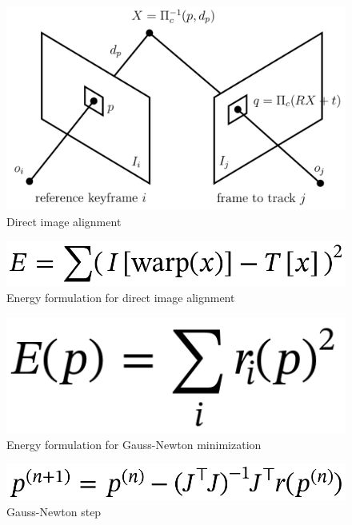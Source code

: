 \begin{figure}[ht]
	\centering
	\includegraphics[width=\linewidth]{assets/img/direct-image-alignment.png}
	\caption{Direct image alignment}%
	\label{fig:direct-image-alignment}
\end{figure}

\begin{figure}[ht]
	\centering
	\includegraphics[width=\linewidth]{assets/img/energy-warp.png}
	\caption{Energy formulation for direct image alignment}%
	\label{fig:energy-warp}
\end{figure}

\begin{figure}[ht]
	\centering
	\includegraphics[width=\linewidth]{assets/img/energy-gauss-newton.png}
	\caption{Energy formulation for Gauss-Newton minimization}%
	\label{fig:energy-gauss-newton}
\end{figure}

\begin{figure}[ht]
	\centering
	\includegraphics[width=\linewidth]{assets/img/gauss-newton-step.png}
	\caption{Gauss-Newton step}%
	\label{fig:gauss-newton-step}
\end{figure}

